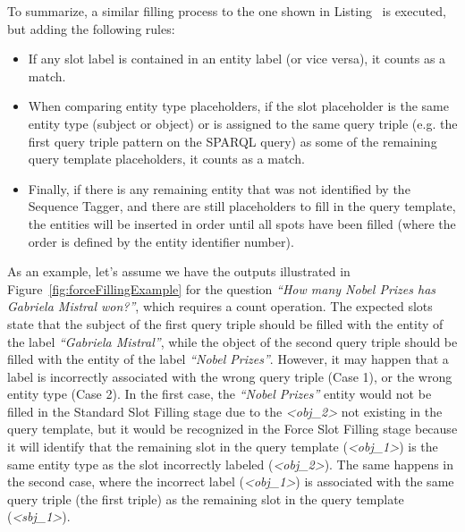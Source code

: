 To summarize, a similar filling process to the one shown in Listing~\cite{lst:standardFillingAlgorithm} 
is executed, but adding the following rules:
\begin{itemize}
    \item If any slot label is contained in an entity label (or vice versa), it counts as a 
    match.
    \item When comparing entity type placeholders, if the slot placeholder is the same entity 
    type (subject or object) or is assigned to the same query triple (e.g. the first query 
    triple pattern on the SPARQL query) as some of the remaining query template placeholders, 
    it counts as a match.
    \item Finally, if there is any remaining entity that was not identified by the Sequence 
    Tagger, and there are still placeholders to fill in the query template, the entities will 
    be inserted in order until all spots have been filled (where the order is defined by the 
    entity identifier number).
\end{itemize}

As an example, let’s assume we have the outputs illustrated in Figure~\ref{fig:forceFillingExample} 
for the question \textit{“How many Nobel Prizes has Gabriela Mistral won?”}, which requires a 
count operation. The expected slots state that the subject of the first query triple should 
be filled with the entity of the label \textit{“Gabriela Mistral”}, while the object of the 
second query triple should be filled with the entity of the label \textit{“Nobel Prizes”}. 
However, it may happen that a label is incorrectly associated with the wrong query triple 
(Case 1), or the wrong entity type (Case 2). In the first case, the \textit{“Nobel Prizes”} 
entity would not be filled in the Standard Slot Filling stage due to the \textit{<obj\_2>} 
not existing in the query template, but it would be recognized in the Force Slot Filling 
stage because it will identify that the remaining slot in the query template (\textit{<obj\_1>}) 
is the same entity type as the slot incorrectly labeled (\textit{<obj\_2>}). The same happens 
in the second case, where the incorrect label (\textit{<obj\_1>}) is associated with the same 
query triple (the first triple) as the remaining slot in the query template (\textit{<sbj\_1>}).

